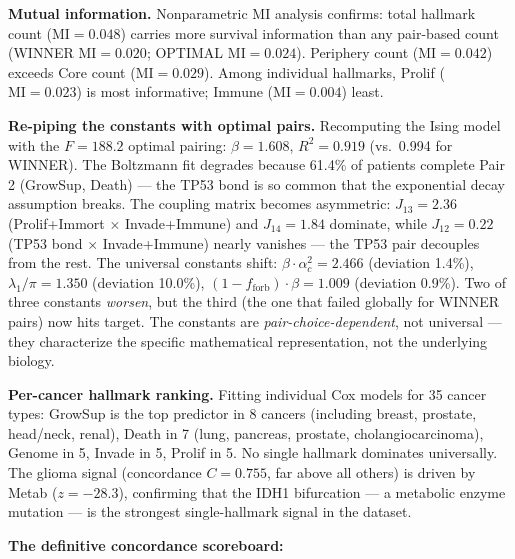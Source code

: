 \documentclass[
  11pt,
]{article}
\begin{document}
\textbf{Mutual information.} Nonparametric MI analysis confirms: total
hallmark count (\(\mathrm{MI} = 0.048\)) carries more survival
information than any pair-based count (WINNER \(\mathrm{MI} = 0.020\);
OPTIMAL \(\mathrm{MI} = 0.024\)). Periphery count
(\(\mathrm{MI} = 0.042\)) exceeds Core count (\(\mathrm{MI} = 0.029\)).
Among individual hallmarks, Prolif (\(\mathrm{MI} = 0.023\)) is most
informative; Immune (\(\mathrm{MI} = 0.004\)) least.

\textbf{Re-piping the constants with optimal pairs.} Recomputing the
Ising model with the \(F = 188.2\) optimal pairing: \(\beta = 1.608\),
\(R^2 = 0.919\) (vs.~0.994 for WINNER). The Boltzmann fit degrades
because 61.4\% of patients complete Pair 2 (GrowSup, Death) --- the TP53
bond is so common that the exponential decay assumption breaks. The
coupling matrix becomes asymmetric: \(J_{13} = 2.36\) (Prolif+Immort
\(\times\) Invade+Immune) and \(J_{14} = 1.84\) dominate, while
\(J_{12} = 0.22\) (TP53 bond \(\times\) Invade+Immune) nearly vanishes
--- the TP53 pair decouples from the rest. The universal constants
shift: \(\beta \cdot \alpha_c^2 = 2.466\) (deviation 1.4\%),
\(\lambda_1/\pi = 1.350\) (deviation 10.0\%),
\((1 - f_\mathrm{forb}) \cdot \beta = 1.009\) (deviation 0.9\%). Two of
three constants \emph{worsen}, but the third (the one that failed
globally for WINNER pairs) now hits target. The constants are
\emph{pair-choice-dependent}, not universal --- they characterize the
specific mathematical representation, not the underlying biology.

\textbf{Per-cancer hallmark ranking.} Fitting individual Cox models for
35 cancer types: GrowSup is the top predictor in 8 cancers (including
breast, prostate, head/neck, renal), Death in 7 (lung, pancreas,
prostate, cholangiocarcinoma), Genome in 5, Invade in 5, Prolif in 5. No
single hallmark dominates universally. The glioma signal (concordance
\(C = 0.755\), far above all others) is driven by Metab (\(z = -28.3\)),
confirming that the IDH1 bifurcation --- a metabolic enzyme mutation ---
is the strongest single-hallmark signal in the dataset.

\textbf{The definitive concordance scoreboard:}
\end{document}

